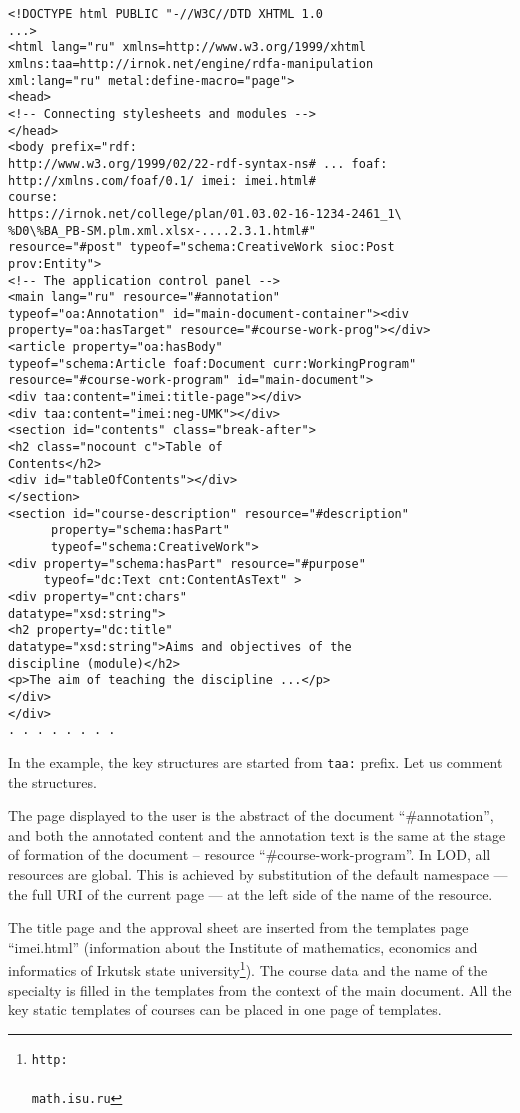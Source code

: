 \documentclass[conference,a4paper]{IEEEtran}
\providecommand\url[1]{\texttt{#1}}
\begin{document}
\begin{verbatim}
<!DOCTYPE html PUBLIC "-//W3C//DTD XHTML 1.0
...>
<html lang="ru" xmlns=http://www.w3.org/1999/xhtml
xmlns:taa=http://irnok.net/engine/rdfa-manipulation
xml:lang="ru" metal:define-macro="page">
<head>
<!-- Connecting stylesheets and modules -->
</head>
<body prefix="rdf:
http://www.w3.org/1999/02/22-rdf-syntax-ns# ... foaf:
http://xmlns.com/foaf/0.1/ imei: imei.html#
course:
https://irnok.net/college/plan/01.03.02-16-1234-2461_1\
%D0\%BA_PB-SM.plm.xml.xlsx-....2.3.1.html#"
resource="#post" typeof="schema:CreativeWork sioc:Post
prov:Entity">
<!-- The application control panel -->
<main lang="ru" resource="#annotation"
typeof="oa:Annotation" id="main-document-container"><div
property="oa:hasTarget" resource="#course-work-prog"></div>
<article property="oa:hasBody"
typeof="schema:Article foaf:Document curr:WorkingProgram"
resource="#course-work-program" id="main-document">
<div taa:content="imei:title-page"></div>
<div taa:content="imei:neg-UMK"></div>
<section id="contents" class="break-after">
<h2 class="nocount c">Table of
Contents</h2>
<div id="tableOfContents"></div>
</section>
<section id="course-description" resource="#description"
      property="schema:hasPart"
      typeof="schema:CreativeWork">
<div property="schema:hasPart" resource="#purpose"
     typeof="dc:Text cnt:ContentAsText" >
<div property="cnt:chars"
datatype="xsd:string">
<h2 property="dc:title"
datatype="xsd:string">Aims and objectives of the
discipline (module)</h2>
<p>The aim of teaching the discipline ...</p>
</div>
</div>
. . . . . . . .
\end{verbatim}

In the example, the key structures are started from \texttt{taa:} prefix. Let us
comment the structures.

The page displayed to the user is the abstract of the document
``\#annotation'', and both the annotated content and the annotation text
is the same at the stage of formation of the document -- resource
``\#course-work-program''. In LOD, all resources are global. This is
achieved by substitution of the default namespace --- the full URI of the
current page --- at the left side of the name of the resource.

The title page and the approval sheet are inserted from the templates
page ``imei.html'' (information about the Institute of mathematics,
economics and informatics of Irkutsk state university\footnote{\url{http:\\\\math.isu.ru}}).
The course data and the name of the specialty is filled in the templates
from the context of the main document. All the key static templates of
courses can be placed in one page of templates.
\end{document}
